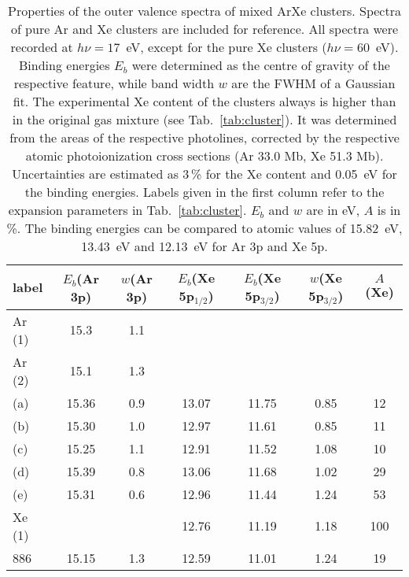 \begin{table}
\caption{Properties of the outer valence spectra of mixed ArXe clusters. Spectra of pure Ar and Xe clusters are included for reference. All spectra were recorded at $h\nu = 17$~eV, except for the pure Xe clusters ($h\nu = 60$~eV). Binding energies $E_b$ were determined as the centre of gravity of the respective feature, while band width $w$ are the FWHM of a Gaussian fit. The experimental Xe content of the clusters always is higher than in the original gas mixture (see Tab.\ \protect\ref{tab:cluster}). It was determined from the areas of the respective photolines, corrected by the respective atomic photoionization cross sections (Ar 33.0 Mb, Xe 51.3 Mb)\cite{samson2002}. Uncertainties are estimated as 3\,\% for the Xe content and 0.05~eV for the binding energies. Labels given in the first column refer to the expansion parameters in Tab.\ \protect\ref{tab:cluster}. $E_b$ and $w$ are in eV, $A$ is in \%. The binding energies can be compared to atomic values of 15.82~eV, 13.43~eV and 12.13~eV for Ar 3p and Xe 5p.
\label{tab:valence} }
\begin{tabular}{ l c c c c c c}
%
\toprule
  label & $E_b$(Ar 3p) & $w$(Ar 3p) & $E_b$(Xe 5p$_{1/2}$) &  $E_b$(Xe 5p$_{3/2}$) & $w$(Xe 5p$_{3/2}$)  &  $A$(Xe) \\
%
\midrule
 Ar (1) &  15.3  &  1.1 & & & &  \\
 Ar (2) &  15.1  &  1.3 & & & &  \\
%
 (a) & 15.36 & 0.9 & 13.07 & 11.75 & 0.85 & 12\\
 (b) & 15.30 & 1.0 & 12.97 & 11.61 & 0.85 & 11\\
 (c) & 15.25 & 1.1 & 12.91 & 11.52 & 1.08 & 10\\
 (d) & 15.39 & 0.8 & 13.06 & 11.68 & 1.02 & 29\\
 (e) & 15.31 & 0.6 & 12.96 & 11.44 & 1.24 & 53\\
Xe (1) & & & 12.76 & 11.19 & 1.18 & 100\\
%
\midrule
%
 886 & 15.15 & 1.3 & 12.59 & 11.01 & 1.24 & 19\\
\bottomrule
\end{tabular}
\end{table}
